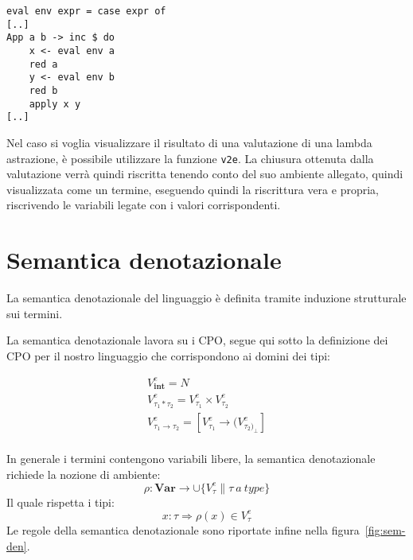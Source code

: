 \documentclass{article}
\begin{document}
\begin{verbatim}
eval env expr = case expr of
[..]
App a b -> inc $ do
    x <- eval env a
    red a
    y <- eval env b
    red b
    apply x y
[..]
\end{verbatim}

Nel caso si voglia visualizzare il risultato di una valutazione di una lambda astrazione, è possibile utilizzare la funzione  \texttt{v2e}. La chiusura ottenuta dalla valutazione verrà quindi riscritta tenendo conto del suo ambiente allegato, quindi visualizzata come un termine, eseguendo quindi la riscrittura vera e propria, riscrivendo le variabili legate con i valori corrispondenti.



\section{Semantica denotazionale}
\label{sec:denotational}
La semantica denotazionale del linguaggio è definita tramite induzione strutturale sui termini.

La semantica denotazionale lavora su i CPO, segue qui sotto la definizione dei CPO per il nostro linguaggio che corrispondono ai domini dei tipi:

\begin{gather*}
V^{e}_{\mathbf{int}} = N
\\
V^{e}_{\tau_{1} * \tau_{2}} = V^{e}_{\tau_{1}} \times V^{e}_{\tau_{2}}
\\
V^{e}_{\tau_{1} \rightarrow \tau_{2}} = [V^{e}_{\tau_{1}} \rightarrow (V^{e}_{\tau_{2})_{\perp}}]
\\
\end{gather*}

In generale i termini contengono variabili libere, la semantica denotazionale richiede la nozione di ambiente:
$$
\rho : \mathbf{Var} \rightarrow \cup \{ V^{e}_\tau \| \tau \ a \ type \}
$$
Il quale rispetta i tipi:
$$
x : \tau \Rightarrow \rho ( x ) \in V^{e}_{\tau}
$$
Le regole della semantica denotazionale sono riportate infine nella figura~\ref{fig:sem-den}.
\end{document}

